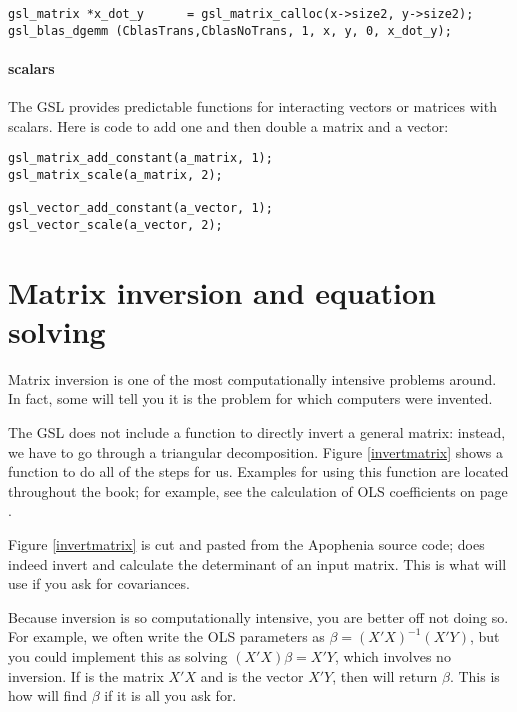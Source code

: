 \begin{lstlisting}
gsl_matrix *x_dot_y      = gsl_matrix_calloc(x->size2, y->size2);
gsl_blas_dgemm (CblasTrans,CblasNoTrans, 1, x, y, 0, x_dot_y);
\end{lstlisting}

\paragraph{scalars} The GSL provides predictable functions for
interacting vectors or matrices with scalars. Here is code to add one
and then double a matrix and a vector:
\begin{lstlisting}
gsl_matrix_add_constant(a_matrix, 1);
gsl_matrix_scale(a_matrix, 2);

gsl_vector_add_constant(a_vector, 1);
gsl_vector_scale(a_vector, 2);
\end{lstlisting}
 
 

\section{Matrix inversion and equation solving}  
Matrix inversion is one of the most computationally intensive problems
around. In fact, some will tell you it is the problem for which computers were invented.

The GSL does not include a function to directly invert a general matrix:
instead, we have to go through a triangular decomposition. Figure
\ref{invertmatrix} shows a function to do all of the steps for us.
Examples for using this function are located throughout the book; for
example, see the calculation of OLS coefficients on page \pageref{ols}.


Figure \ref{invertmatrix} is cut and pasted from the Apophenia source
code;  does indeed invert and calculate the
determinant of an input matrix. This is what  will use if
you ask for covariances.

Because inversion is so computationally intensive, you are better off
not doing so.  For example, we often write the OLS parameters as $\beta
=(X'X)^{-1}(X'Y)$, but you could implement this as solving
$(X'X)\beta = X'Y$, which involves no inversion. If  is the
matrix $X'X$ and  is the vector $X'Y$, then 
 will
return $\beta$. This is how  will find $\beta$ if it
is all you ask for.

